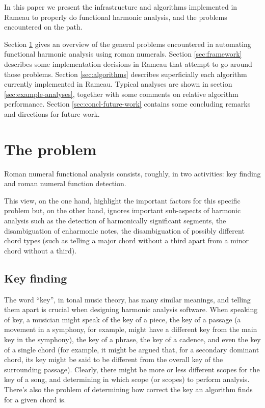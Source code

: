 In this paper we present the infrastructure and algorithms implemented
in Rameau to properly do functional harmonic analysis, and the
problems encountered on the path.

Section \ref{sec:problem} gives an overview of the general problems
encountered in automating functional harmonic analysis using roman
numerals. Section \ref{sec:framework} describes some implementation
decisions in Rameau that attempt to go around those problems. Section
\ref{sec:algorithms} describes superficially each algorithm currently
implemented in Rameau. Typical analyses are shown in section
\ref{sec:example-analyses}, together with some comments on relative
algorithm performance. Section \ref{sec:concl-future-work} contains
some concluding remarks and directions for future work.

\section{The problem}
\label{sec:problem}

Roman numeral functional analysis consists, roughly, in two
activities: key finding and roman numeral function detection. 


This view, on the one hand, highlight the important factors for this
specific problem but, on the other hand, ignores important sub-aspects
of harmonic analysis such as the detection of harmonically significant
segments, the disambiguation of enharmonic notes, the disambiguation
of possibly different chord types (such as telling a major chord
without a third apart from a minor chord without a third).

\subsection{Key finding}
\label{sec:key-finding}


The word ``key'', in tonal music theory, has many similar meanings,
and telling them apart is crucial when designing harmonic analysis
software. When speaking of key, a musician might speak of the key of a
piece, the key of a passage (a movement in a symphony, for example,
might have a different key from the main key in the symphony), the key
of a phrase, the key of a cadence, and even the key of a single chord
(for example, it might be argued that, for a secondary dominant chord,
its key might be said to be different from the overall key of the
surrounding passage). Clearly, there might be more or less different
scopes for the key of a song, and determining in which scope (or
scopes) to perform analysis. There's also the problem of determining
how correct the key an algorithm finds for a given chord is.

